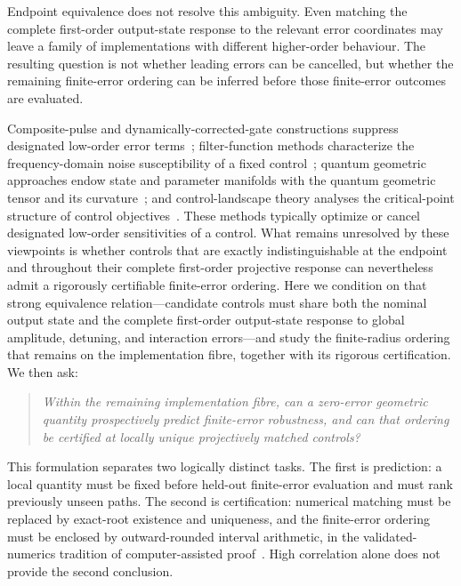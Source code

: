 Endpoint equivalence does not resolve this ambiguity. Even matching the complete
first-order output-state response to the relevant error coordinates may leave a family of
implementations with different higher-order behaviour. The resulting question is not
whether leading errors can be cancelled, but whether the remaining finite-error ordering
can be inferred before those finite-error outcomes are evaluated.

Composite-pulse and dynamically-corrected-gate constructions suppress designated low-order
error
terms~\cite{wimperis1994,kukita2022,barnes2015,khaneja2005,vandersypen2005,khodjasteh2009};
filter-function methods characterize the frequency-domain noise susceptibility of a fixed
control~\cite{green2013}; quantum geometric approaches endow state and parameter manifolds
with the quantum geometric tensor and its curvature~\cite{provost1980}; and
control-landscape theory analyses the critical-point structure of control
objectives~\cite{rabitz2004,chakrabarti2007}. These methods typically optimize or cancel
designated low-order sensitivities of a control. What remains unresolved by these
viewpoints is whether controls that are exactly indistinguishable at the endpoint and
throughout their complete first-order projective response can nevertheless admit a
rigorously certifiable finite-error ordering. Here we condition on that strong
equivalence relation---candidate controls must share both the nominal output state and the
complete first-order output-state response to global amplitude, detuning, and interaction
errors---and study the finite-radius ordering that remains on the implementation fibre,
together with its rigorous certification. We then ask:

\begin{quote}
\sloppy
\emph{Within the remaining implementation fibre, can a zero-error geometric quantity
prospectively predict finite-error robustness, and can that ordering be certified at
locally unique projectively matched controls?}
\end{quote}

This formulation separates two logically distinct tasks. The first is prediction: a local
quantity must be fixed before held-out finite-error evaluation and must rank previously
unseen paths. The second is certification: numerical matching must be replaced by
exact-root existence and uniqueness, and the finite-error ordering must be enclosed by
outward-rounded interval arithmetic, in the validated-numerics tradition of
computer-assisted proof~\cite{lanford1982,tucker2002,vandenberg2015}. High correlation
alone does not provide the second conclusion.

